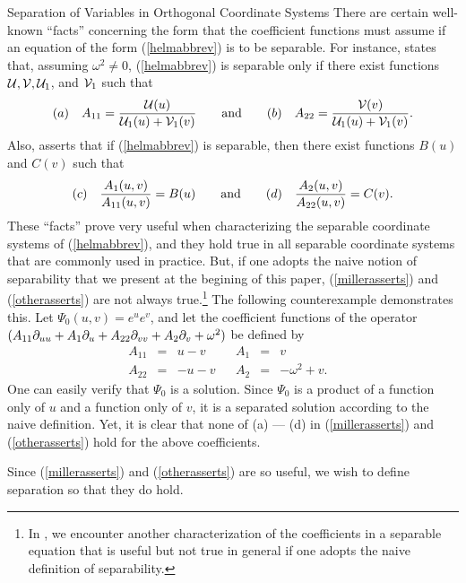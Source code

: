 \begin{section}{Separation of Variables in Orthogonal Coordinate Systems}
There are certain well-known ``facts'' concerning the form that the coefficient functions must assume if an equation of the form (\ref{helmabbrev}) is to be separable.  For instance, \cite[p.~14]{miller} states that, assuming $\omega^2 \not= 0$, (\ref{helmabbrev}) is separable only if there exist functions $\mathcal{U}, \mathcal{V}, \mathcal{U}_1$, and $\mathcal{V}_1$ such that
\begin{equation}
\label{millerasserts}
\mbox{$(a)$} \quad A_{11} = \frac{\mathcal{U}(u)}{\mathcal{U}_1(u) + \mathcal{V}_1(v)}
\qquad \mbox{and} \qquad
\mbox{$(b)$} \quad A_{22} = \frac{\mathcal{V}(v)}{\mathcal{U}_1(u) + \mathcal{V}_1(v)}.
\end{equation}
Also, \cite{robertson} asserts that if (\ref{helmabbrev}) is separable, then there exist functions $B(u)$ and $C(v)$ such that
\begin{equation}
\label{otherasserts}
\mbox{$(c)$} \quad   \frac{A_1(u,v)}{A_{11}(u,v)} = B(u)
\qquad \mbox{and} \qquad
\mbox{$(d)$} \quad   \frac{A_2(u,v)}{A_{22}(u,v)} = C(v).
\end{equation}
These ``facts'' prove very useful when characterizing the separable coordinate systems of (\ref{helmabbrev}), and they hold true in all separable coordinate systems that are commonly used in practice.  But, if one adopts the naive notion of separability that we present at the begining of this paper, (\ref{millerasserts}) and (\ref{otherasserts}) are not always true.\footnote{In \cite[p.~505]{hildebrand}, we encounter another characterization of the coefficients in a separable equation that is useful but not true in general if one adopts the naive definition of separability.}  The following counterexample demonstrates this.
Let $\Psi_0(u,v) = e^u e^v$, and let the coefficient functions of the operator $(A_{11} \partial_{u u} + A_1 \partial_{u} + A_{22} \partial_{v v} + A_2 \partial_{v} + \omega^2)$ be defined by
\[
\begin{array}{rclcrcll}
A_{11}	&=	&u-v	&		&A_1	&= 	&v		&  \\
A_{22}	&=	&-u-v	&		&A_2	&=	&-\omega^2+v.	&  
\end{array}
\]
One can easily verify that $\Psi_0$ is a solution.  Since $\Psi_0$ is a product of a function only of $u$ and a function only of $v$, it is a separated solution according to the naive definition.  Yet, it is clear that none of (a) --- (d) in (\ref{millerasserts}) and (\ref{otherasserts}) hold for the above coefficients.

\eex

Since (\ref{millerasserts}) and (\ref{otherasserts}) are so useful, we wish to define separation so that they do hold.


\end{section}
